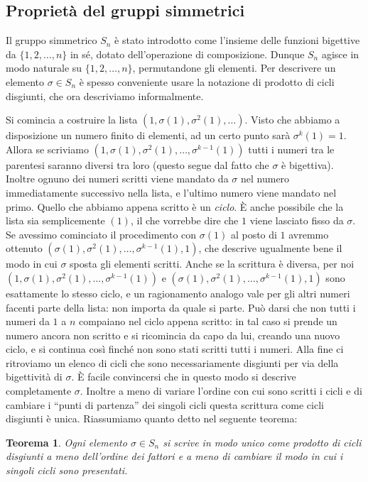 \documentclass[11pt]{article}
\theoremstyle{plain}
\newtheorem{thm}{Teorema}[section]
\theoremstyle{definition}
\theoremstyle{remark}
\begin{document}
\subsection{Proprietà del gruppi simmetrici}
Il gruppo simmetrico $S_n$ è stato introdotto come l'insieme delle funzioni bigettive da $\{1,2,\dots,n\}$ in sé, dotato dell'operazione di composizione.
Dunque $S_n$ agisce in modo naturale su $\{1,2,\dots,n\}$, permutandone gli elementi. Per descrivere un elemento $\sigma \in S_n$
è spesso conveniente usare la notazione di prodotto di cicli disgiunti, che ora descriviamo informalmente.

Si comincia a costruire la lista $(1, \sigma(1), \sigma^2(1), \dots)$. Visto che abbiamo a disposizione un numero finito di elementi,
ad un certo punto sarà $\sigma^k(1) = 1$. Allora se scriviamo $(1, \sigma(1), \sigma^2(1), \dots, \sigma^{k-1}(1))$ tutti i numeri tra le
parentesi saranno diversi tra loro (questo segue dal fatto che $\sigma$ è bigettiva). Inoltre ognuno dei numeri scritti viene mandato da $\sigma$
nel numero immediatamente successivo nella lista, e l'ultimo numero viene mandato nel primo. Quello che abbiamo appena scritto è un \emph{ciclo}.
\`E anche possibile che la lista sia semplicemente $(1)$, il che vorrebbe dire che $1$ viene lasciato fisso da $\sigma$.
Se avessimo cominciato il procedimento con $\sigma(1)$ al posto di $1$ avremmo ottenuto $(\sigma(1), \sigma^2(1), \dots, \sigma^{k-1}(1), 1)$, che
descrive ugualmente bene il modo in cui $\sigma$ sposta gli elementi scritti. Anche se la scrittura è diversa, per noi
$(1, \sigma(1), \sigma^2(1), \dots, \sigma^{k-1}(1))$ e $(\sigma(1), \sigma^2(1), \dots, \sigma^{k-1}(1), 1)$ sono esattamente lo stesso ciclo,
e un ragionamento analogo vale per gli altri numeri facenti parte della lista: non importa da quale si parte.
Può darsi che non tutti i numeri da $1$ a $n$ compaiano nel ciclo appena scritto: in tal caso si prende un numero ancora non scritto e si ricomincia da capo
da lui, creando una nuovo ciclo, e si continua così finché non sono stati scritti tutti i numeri.
Alla fine ci ritroviamo un elenco di cicli che sono necessariamente disgiunti per via della bigettività di $\sigma$.
\`E facile convincersi che in questo modo si descrive completamente $\sigma$. Inoltre a meno di variare
l'ordine con cui sono scritti i cicli e di cambiare i ``punti di partenza'' dei singoli cicli questa scrittura come cicli disgiunti è unica.
Riassumiamo quanto detto nel seguente teorema:

\begin{thm}
Ogni elemento $\sigma \in S_n$ si scrive in modo unico come prodotto di cicli disgiunti a meno dell'ordine dei fattori e a meno di
cambiare il modo in cui i singoli cicli sono presentati.
\end{thm}
\end{document}
